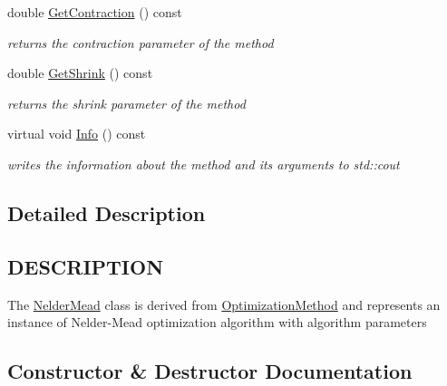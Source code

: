 \begin{DoxyCompactItemize}
double \hyperlink{class_nelder_mead_a1b370090db3d9b58a662eab50a6ed3c9}{Get\+Contraction} () const
\begin{DoxyCompactList}\small\item\em returns the contraction parameter of the method \end{DoxyCompactList}\item 
\mbox{\label{class_nelder_mead_a2333e386995f2a3025ec61a20c5d3f0f}} 
double \hyperlink{class_nelder_mead_a2333e386995f2a3025ec61a20c5d3f0f}{Get\+Shrink} () const
\begin{DoxyCompactList}\small\item\em returns the shrink parameter of the method \end{DoxyCompactList}\item 
\mbox{\label{class_nelder_mead_a651153fd9c477da6e2aeeb2473251506}} 
virtual void \hyperlink{class_nelder_mead_a651153fd9c477da6e2aeeb2473251506}{Info} () const
\begin{DoxyCompactList}\small\item\em writes the information about the method and its arguments to std\+::cout \end{DoxyCompactList}\end{DoxyCompactItemize}


\subsection{Detailed Description}
\hypertarget{function_8h_DESCRIPTION}{}\subsection{D\+E\+S\+C\+R\+I\+P\+T\+I\+ON}\label{function_8h_DESCRIPTION}
The \hyperlink{class_nelder_mead}{Nelder\+Mead} class is derived from \hyperlink{class_optimization_method}{Optimization\+Method} and represents an instance of Nelder-\/\+Mead optimization algorithm with algorithm parameters 

\subsection{Constructor \& Destructor Documentation}
\mbox{\label{class_nelder_mead_afbf2f00242cc95bd533c8bd6a5dfbba6}} 
